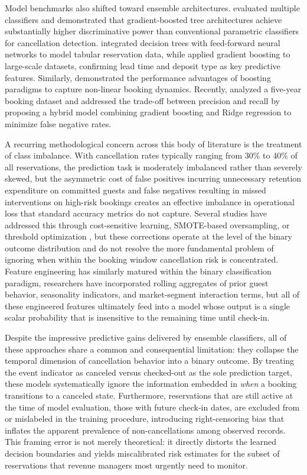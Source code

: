 \documentclass[pdflatex,iicol,sn-mathphys-ay]{sn-jnl}
\theoremstyle{thmstyleone}%
\theoremstyle{thmstyletwo}%
\theoremstyle{thmstylethree}%
\begin{document}
Model benchmarks also shifted toward ensemble architectures. \cite{yoo2024predicting} evaluated multiple classifiers and demonstrated that gradient-boosted tree architectures achieve substantially higher discriminative power than conventional parametric classifiers for cancellation detection. \cite{yang2024predicting} integrated decision trees with feed-forward neural networks to model tabular reservation data, while \cite{luo2025hotel} applied gradient boosting to large-scale datasets, confirming lead time and deposit type as key predictive features. Similarly, \cite{febrian2024hotel} demonstrated the performance advantages of boosting paradigms to capture non-linear booking dynamics. Recently, \cite{ampountolas2025predicting} analyzed a five-year booking dataset and addressed the trade-off between precision and recall by proposing a hybrid model combining gradient boosting and Ridge regression to minimize false negative rates.

A recurring methodological concern across this body of literature is the treatment of class imbalance. With cancellation rates typically ranging from 30\% to 40\% of all reservations, the prediction task is moderately imbalanced rather than severely skewed, but the asymmetric cost of false positives incurring unnecessary retention expenditure on committed guests and false negatives resulting in missed interventions on high-risk bookings creates an effective imbalance in operational loss that standard accuracy metrics do not capture. Several studies have addressed this through cost-sensitive learning, SMOTE-based oversampling, or threshold optimization \citep{liu2023hospitality, ampountolas2025predicting}, but these corrections operate at the level of the binary outcome distribution and do not resolve the more fundamental problem of ignoring when within the booking window cancellation risk is concentrated. Feature engineering has similarly matured within the binary classification paradigm, researchers have incorporated rolling aggregates of prior guest behavior, seasonality indicators, and market-segment interaction terms, but all of these engineered features ultimately feed into a model whose output is a single scalar probability that is insensitive to the remaining time until check-in.

Despite the impressive predictive gains delivered by ensemble classifiers, all of these approaches share a common and consequential limitation: they collapse the temporal dimension of cancellation behavior into a binary outcome. By treating the event indicator as canceled versus checked-out as the sole prediction target, these models systematically ignore the information embedded in \textit{when} a booking transitions to a canceled state. Furthermore, reservations that are still active at the time of model evaluation, those with future check-in dates, are excluded from or mislabeled in the training procedure, introducing right-censoring bias that inflates the apparent prevalence of non-cancellations among observed records. This framing error is not merely theoretical: it directly distorts the learned decision boundaries and yields miscalibrated risk estimates for the subset of reservations that revenue managers most urgently need to monitor.
\end{document}
